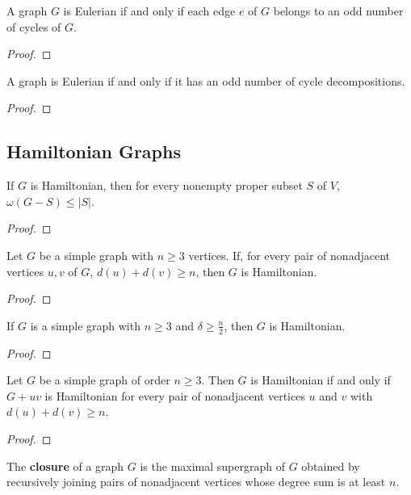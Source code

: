\begin{theorem}
	A graph $G$ is Eulerian if and only if each edge $e$ of $G$ belongs to an odd number of cycles of $G$.
\end{theorem}
\begin{proof}
\end{proof}

\begin{corollary}
	A graph is Eulerian if and only if it has an odd number of cycle decompositions.
\end{corollary}
\begin{proof}
\end{proof}

\subsection{Hamiltonian Graphs}
\begin{theorem}
	If $G$ is Hamiltonian, then for every nonempty proper subset $S$ of $V$, $\omega(G-S) \le |S|$.
\end{theorem}
\begin{proof}
\end{proof}

\begin{theorem}[Ore]
	Let $G$ be a simple graph with $n \ge 3$ vertices. If, for every pair of nonadjacent vertices $u,v$ of $G$, $d(u) + d(v) \ge n$, then $G$ is Hamiltonian.
\end{theorem}
\begin{proof}
\end{proof}

\begin{corollary}[Dirac]
	If $G$ is a simple graph with $n \ge 3$ and $\delta \ge \frac{n}{2}$, then $G$ is Hamiltonian.
\end{corollary}
\begin{proof}
\end{proof}

\begin{theorem}
	Let $G$ be a simple graph of order $n \ge 3$. Then $G$ is Hamiltonian if and only if $G + uv$ is Hamiltonian for every pair of nonadjacent vertices $u$ and $v$ with $d(u) + d(v) \ge n$.
\end{theorem}
\begin{proof}
\end{proof}

\begin{definition}
	The \textbf{closure} of a graph $G$ is the maximal supergraph of $G$ obtained by recursively joining pairs of nonadjacent vertices whose degree sum is  at least $n$.
\end{definition}

